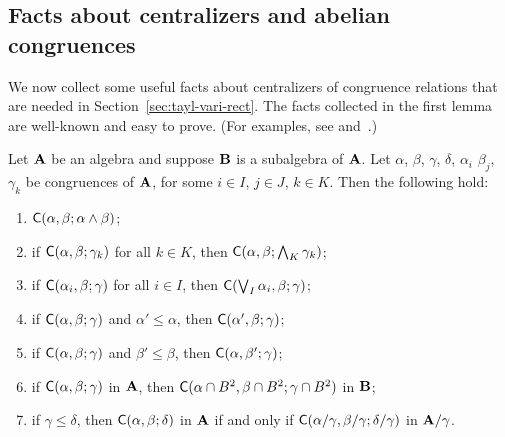 

\subsection{Facts about centralizers and abelian congruences}
We now collect some useful facts about centralizers of congruence relations
that are needed in Section~\ref{sec:tayl-vari-rect}.
The facts collected in the first lemma are well-known and easy to prove.
(For examples, see \cite[Prop~3.4]{HM:1988} and~\cite[Thm~2.19]{MR3076179}.)
\begin{lemma}
\label{lem:centralizers}
Let $\mathbf{A}$ be an algebra and suppose
$\mathbf{B}$ is a subalgebra of $\mathbf{A}$. 
Let $\alpha$, $\beta$, $\gamma$, $\delta$, $\alpha_i$
$\beta_j$, $\gamma_k$
be congruences of $\mathbf{A}$, for some 
$i \in I$, $j\in J$, $k \in K$. Then the following hold:
\begin{enumerate}
\item \label{centralizing_over_meet}
  $\mathsf{C}(\alpha, \beta; \alpha \wedge \beta)$;
\item \label{centralizing_over_meet2}
  if $\mathsf{C}(\alpha,  \beta;  \gamma_k)$ for all $k \in K$, then
  $\mathsf{C}(\alpha,  \beta;  \bigwedge_{K}\gamma_k)$;
\item \label{centralizing_over_join1}
  if $\mathsf{C}(\alpha_i,  \beta;  \gamma)$ for all $i\in I$, then
  $\mathsf{C}(\bigvee_{I}\alpha_i,  \beta; \gamma)$;
\item \label{monotone_centralizers1}
  if $\mathsf{C}(\alpha,  \beta;  \gamma)$ and $\alpha' \leq \alpha$, then 
  $\mathsf{C}(\alpha',  \beta;  \gamma)$;
\item \label{monotone_centralizers2}
  if $\mathsf{C}(\alpha,  \beta;  \gamma)$ and $\beta' \leq \beta$, then
  $\mathsf{C}(\alpha,  \beta';  \gamma)$;
\item \label{centralizing_over_subalg}
  if $\mathsf{C}(\alpha,  \beta;  \gamma)$ in $\mathbf{A}$, 
  then $\mathsf{C}(\alpha\cap B^2,  \beta\cap B^2; \gamma\cap B^2)$ in $\mathbf{B}$;
\item \label{centralizing_factors}
  if $\gamma \leq \delta$, then $\mathsf{C}(\alpha,  \beta;  \delta)$
  in $\mathbf{A}$ if and only if $\mathsf{C}(\alpha/\gamma,  \beta/\gamma;  \delta/\gamma)$
  in $\mathbf{A}/\gamma$.
\end{enumerate}
\end{lemma}

